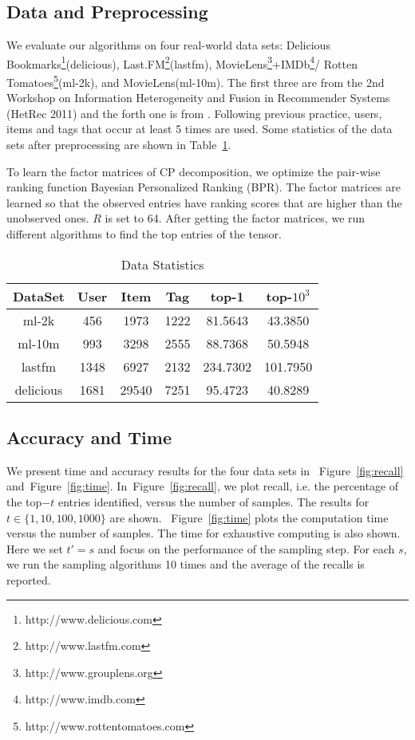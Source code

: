 \documentclass[letterpaper]{article}
\newcommand{\Fig}[1]{Figure~\ref{fig:#1}}
\newcommand{\Table}[1]{Table~\ref{table:#1}}
\begin{document}
\subsection{Data and Preprocessing}
We evaluate our algorithms on four real-world data sets:
Delicious Bookmarks\footnote{http://www.delicious.com}(delicious),
Last.FM\footnote{http://www.lastfm.com}(lastfm),
MovieLens\footnote{http://www.grouplens.org}+IMDb\footnote{http://www.imdb.com}/
Rotten Tomatoes\footnote{http://www.rottentomatoes.com}(ml-2k), and MovieLens(ml-10m). 
The first three are from the 2nd Workshop on Information Heterogeneity and Fusion in Recommender Systems (HetRec 2011)
and the forth one is from \cite{Harper2015}.
Following previous practice, users, items and tags that occur at least 5 times are used. 
Some statistics of the data sets after preprocessing are shown in \Table{Data}.

To learn the factor matrices of CP decomposition, 
we optimize the pair-wise 
ranking function Bayesian Personalized Ranking (BPR)\cite{Rendle_BPR,Rendle_RTF}.
The factor matrices are learned so that the observed entries have ranking scores that are higher than the unobserved ones. $R$ is set to 64. After getting the factor matrices, we run different algorithms to find the top entries of the tensor.
\begin{table}[]
  \centering
  \begin{tabular}{|c|c|c|c|c|c|}
    \hline
    DataSet     & User & Item    & Tag    & top-1   & top-$10^3$\\
    \hline
    ml-2k       & 456  &  1973   &  1222  & 81.5643  & 43.3850 \\
    ml-10m      & 993  &  3298   &  2555  & 88.7368 & 50.5948 \\
    lastfm      & 1348 &  6927   &  2132  & 234.7302 & 101.7950\\
    delicious   & 1681 &  29540  &  7251  & 95.4723  & 40.8289 \\
    \hline
  \end{tabular}
  \caption{Data Statistics}
  \label{table:Data}
\end{table}

\subsection{Accuracy and Time}
We present time and accuracy results for the four data sets in 
~\Fig{recall} and~\Fig{time}. 
In~\Fig{recall}, we plot recall, i.e. the percentage of the top$-t$ entries identified, 
versus the number of samples. 
The results for $t\in\{1,10,100,1000\}$ are shown. 
~\Fig{time} plots the computation time versus the number of samples. 
The time for exhaustive computing is also shown. 
Here we set $t'=s$ and focus on the performance of the sampling step. 
For each $s$, we run the sampling algorithms 10 times and the average of the recalls is reported.
\end{document}
